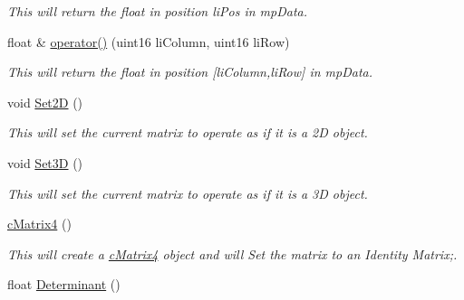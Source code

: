 \begin{DoxyCompactItemize}
\begin{DoxyCompactList}\small\item\em This will return the float in position liPos in mpData. \end{DoxyCompactList}\item 
\hypertarget{classc_matrix4_a1e17bf69091f804aec716524dbdec375}{
float \& \hyperlink{classc_matrix4_a1e17bf69091f804aec716524dbdec375}{operator()} (uint16 liColumn, uint16 liRow)}
\label{classc_matrix4_a1e17bf69091f804aec716524dbdec375}

\begin{DoxyCompactList}\small\item\em This will return the float in position \mbox{[}liColumn,liRow\mbox{]} in mpData. \end{DoxyCompactList}\item 
\hypertarget{classc_matrix4_ad24236403317622459c3309938be9d21}{
void \hyperlink{classc_matrix4_ad24236403317622459c3309938be9d21}{Set2D} ()}
\label{classc_matrix4_ad24236403317622459c3309938be9d21}

\begin{DoxyCompactList}\small\item\em This will set the current matrix to operate as if it is a 2D object. \end{DoxyCompactList}\item 
\hypertarget{classc_matrix4_a746ce09337cbf6a3292cbe15991efd79}{
void \hyperlink{classc_matrix4_a746ce09337cbf6a3292cbe15991efd79}{Set3D} ()}
\label{classc_matrix4_a746ce09337cbf6a3292cbe15991efd79}

\begin{DoxyCompactList}\small\item\em This will set the current matrix to operate as if it is a 3D object. \end{DoxyCompactList}\item 
\hypertarget{classc_matrix4_a51d8e6bf6bbb6b998878fe978c748e14}{
\hyperlink{classc_matrix4_a51d8e6bf6bbb6b998878fe978c748e14}{cMatrix4} ()}
\label{classc_matrix4_a51d8e6bf6bbb6b998878fe978c748e14}

\begin{DoxyCompactList}\small\item\em This will create a \hyperlink{classc_matrix4}{cMatrix4} object and will Set the matrix to an Identity Matrix;. \end{DoxyCompactList}\item 
\hypertarget{classc_matrix4_a39cf7cefa0672684e69eb4af89366270}{
float \hyperlink{classc_matrix4_a39cf7cefa0672684e69eb4af89366270}{Determinant} ()}
\label{classc_matrix4_a39cf7cefa0672684e69eb4af89366270}


\end{DoxyCompactItemize}
